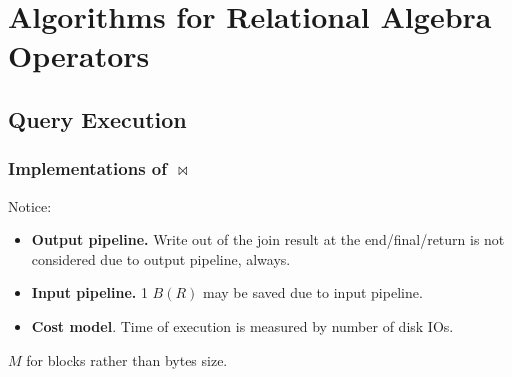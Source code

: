 \documentclass[a4paper]{report}
\begin{document}
\section{Algorithms for Relational Algebra Operators}
\subsection{Query Execution}\label{sec:queryExec}
\subsubsection{Implementations of $\bowtie$}

Notice:
\begin{itemize}
\item \textbf{Output pipeline.} Write out of the join result at the end/final/return is not considered due to output pipeline, always.
\item \textbf{Input pipeline.} 1 $B(R)$ may be saved due to input pipeline. 
\item \textbf{Cost model}. Time of execution is measured by number of disk IOs. 
\end{itemize}

$M$ for blocks rather than bytes size. 
\end{document}
